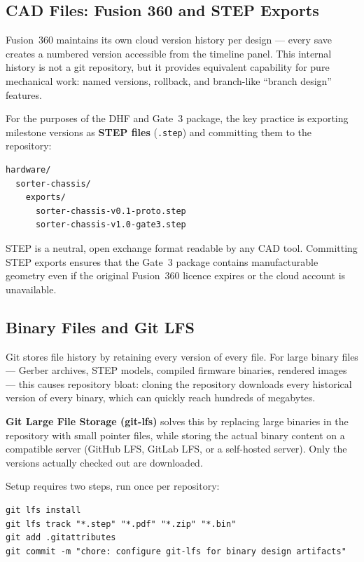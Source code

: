 \subsection{CAD Files: Fusion 360 and STEP Exports}
\label{subsec:ch13-cad}

Fusion~360
maintains its own cloud version history per design --- every save creates a numbered version
accessible from the timeline panel.
This internal history is not a git repository, but it provides equivalent capability for
pure mechanical work: named versions, rollback, and branch-like ``branch design'' features.

For the purposes of the DHF and Gate~3 package, the key practice is exporting milestone
versions as \textbf{STEP files} (\texttt{.step}) and committing them to the repository:

\begin{verbatim}
hardware/
  sorter-chassis/
    exports/
      sorter-chassis-v0.1-proto.step
      sorter-chassis-v1.0-gate3.step
\end{verbatim}

STEP is a neutral, open exchange format readable by any CAD tool.
Committing STEP exports ensures that the Gate~3 package contains manufacturable geometry
even if the original Fusion~360 licence expires or the cloud account is unavailable.

\subsection{Binary Files and Git LFS}
\label{subsec:ch13-lfs}

Git stores file history by retaining every
version of every file.
For large binary files --- Gerber archives, STEP models, compiled firmware binaries,
rendered images --- this causes repository bloat: cloning the repository downloads every
historical version of every binary, which can quickly reach hundreds of megabytes.

\textbf{Git Large File Storage (git-lfs)} solves this by replacing large binaries in the
repository with small pointer files, while storing the actual binary content on a
compatible server (GitHub LFS, GitLab LFS, or a self-hosted server).
Only the versions actually checked out are downloaded.

Setup requires two steps, run once per repository:

\begin{verbatim}
git lfs install
git lfs track "*.step" "*.pdf" "*.zip" "*.bin"
git add .gitattributes
git commit -m "chore: configure git-lfs for binary design artifacts"
\end{verbatim}

